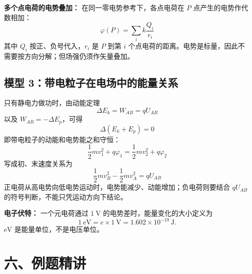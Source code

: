 \begin{center}


\label{fig:point-charge-potential-derivation}
\end{center}

\textbf{多个点电荷的电势叠加：} 在同一零电势参考下，各点电荷在
$P$ 点产生的电势作代数相加：
\[
\boxed{\varphi(P)=\sum_i k\frac{Q_i}{r_i}}
\]
其中 $Q_i$ 按正、负号代入，$r_i$ 是 $P$ 到第 $i$ 个点电荷的距离。电势是标量，因此不需要按方向分解；但场强仍须作矢量叠加。

\begin{center}


\label{fig:potential-superposition}
\end{center}

\subsection*{模型 3：带电粒子在电场中的能量关系}

只有静电力做功时，由动能定理
\[
\Delta E_k=W_{AB}=qU_{AB}
\]
以及 $W_{AB}=-\Delta E_p$，可得
\[
\Delta(E_k+E_p)=0
\]
即带电粒子的动能和电势能之和守恒：
\[
\frac12 mv_1^2 + q\varphi_1 = \frac12 mv_2^2 + q\varphi_2
\]
写成初、末速度关系为
\[
\boxed{\frac12mv_B^2-\frac12mv_A^2=qU_{AB}}
\]
正电荷从高电势向低电势运动时，电势能减少、动能增加；负电荷则要结合 $qU_{AB}$ 的符号判断，不能只凭运动方向下结论。

\begin{center}


\label{fig:electric-potential-energy-conversion}
\end{center}

\textbf{电子伏特：} 一个元电荷通过 $1\ \mathrm V$ 的电势差时，能量变化的大小定义为
\[
1\ \mathrm{eV}=e\times1\ \mathrm V=1.602\times10^{-19}\ \mathrm J.
\]
$\mathrm{eV}$ 是能量单位，不是电压单位。

\newpage
\section*{六、例题精讲}


